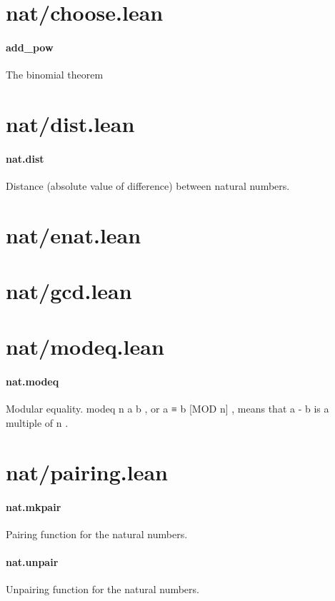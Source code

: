 \documentclass{article}
\begin{document}
\section{nat/choose.lean}\paragraph{add\_pow}
\par
The binomial theorem
\section{nat/dist.lean}\paragraph{nat.dist}
\par
Distance (absolute value of difference) between natural numbers.
\section{nat/enat.lean}\section{nat/gcd.lean}\section{nat/modeq.lean}\paragraph{nat.modeq}
\par
Modular equality. 
\colorbox[RGB]{253,246,227}{{{{\color[RGB]{101, 123, 131} modeq n a b }}}}, or 
\colorbox[RGB]{253,246,227}{{{{\color[RGB]{101, 123, 131} a ≡ b {[}MOD n{]} }}}}, means
that 
\colorbox[RGB]{253,246,227}{{{{\color[RGB]{101, 123, 131} a  }}}{{{\color[RGB]{181, 137, 0} - }}}{{{\color[RGB]{101, 123, 131}  b }}}} is a multiple of 
\colorbox[RGB]{253,246,227}{{{{\color[RGB]{101, 123, 131} n }}}}.
\section{nat/pairing.lean}\paragraph{nat.mkpair}
\par
Pairing function for the natural numbers.
\paragraph{nat.unpair}
\par
Unpairing function for the natural numbers.
\end{document}
